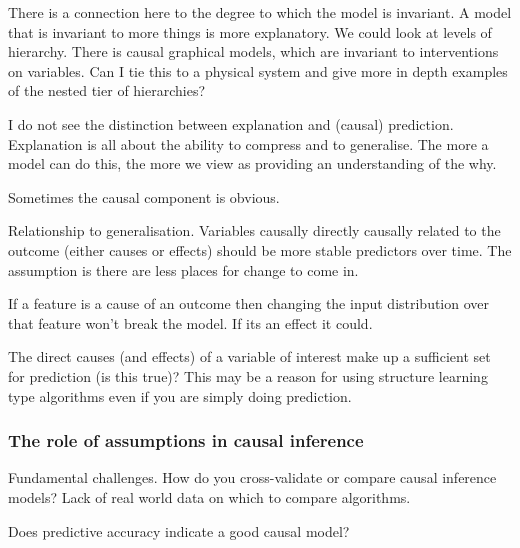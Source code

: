 \documentclass[11pt,a4paper,oneside]{book}
\theoremstyle{plain}
\theoremstyle{definition}
\begin{document}
\begin{figure}[h]
\caption{}
\label{fig:causal_inference_without_do}
\centering
{}
\end{figure}


There is a connection here to the degree to which the model is invariant. A model that is invariant to more things is more explanatory. We could look at levels of hierarchy. There is causal graphical models, which are invariant to interventions on variables. Can I tie this to a physical system and give more in depth examples of the nested tier of hierarchies?

I do not see the distinction between explanation and (causal) prediction. Explanation is all about the ability to compress and to generalise. The more a model can do this, the more we view as providing an understanding of the why. 


Sometimes the causal component is obvious. 

Relationship to generalisation. Variables causally directly causally related to the outcome (either causes or effects) should be more stable predictors over time. The assumption is there are less places for change to come in. 

If a feature is a cause of an outcome then changing the input distribution over that feature won't break the model. If its an effect it could.

The direct causes (and effects) of a variable of interest make up a sufficient set for prediction (is this true)? This may be a reason for using structure learning type algorithms even if you are simply doing prediction.

\subsubsection*{The role of assumptions in causal inference}

Fundamental challenges. How do you cross-validate or compare causal inference models? Lack of real world data on which to compare algorithms. 

Does predictive accuracy indicate a good causal model?
\end{document}
